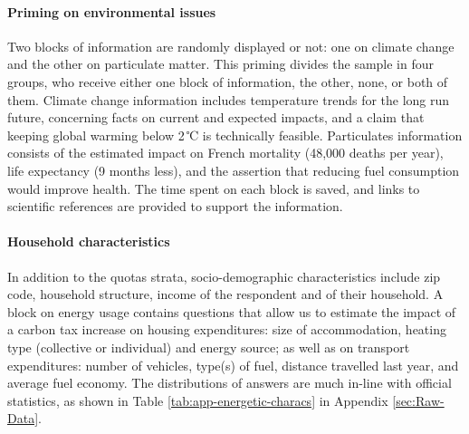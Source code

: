 \documentclass[11pt]{article}
\begin{document}
\paragraph{Priming on environmental issues}
Two blocks of information are randomly displayed or not: one on climate change and the other on particulate matter. This priming divides the sample in four groups, who receive either one block of information, the other, none, or both of them. Climate change information includes temperature trends for the long run future, concerning facts on current and expected impacts, and a claim that keeping global warming below 2\,℃ is technically feasible. Particulates information consists of the estimated impact on French mortality (48,000 deaths per year), life expectancy (9 months less), and the assertion that reducing fuel consumption would improve health. The time spent on each block is saved, and links to scientific references are provided to support the information.

\paragraph{Household characteristics}
In addition to the quotas strata, socio-demographic characteristics include zip code, household structure, income of the respondent and of their household. A block on energy usage contains questions that allow us to estimate the impact of a carbon tax increase on housing expenditures: size of accommodation, heating type (collective or individual) and energy source; as well as on transport expenditures: number of vehicles, type(s) of fuel, distance travelled last year, and average fuel economy. The distributions of answers are much in-line with official statistics, as shown in Table \ref{tab:app-energetic-characs} in Appendix \ref{sec:Raw-Data}.
\end{document}
